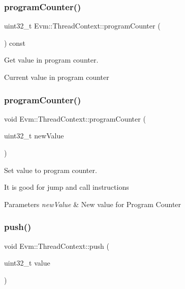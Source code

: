 \subsubsection{\texorpdfstring{program\+Counter()}{programCounter()}\hspace{0.1cm}{\footnotesize\ttfamily [1/2]}}
{\footnotesize\ttfamily uint32\+\_\+t Evm\+::\+Thread\+Context\+::program\+Counter (\begin{DoxyParamCaption}{ }\end{DoxyParamCaption}) const}



Get value in program counter. 

Current value in program counter \mbox{\label{struct_evm_1_1_thread_context_accc8a047d91d5dc8defd19d9a1a1e5a1}} 
\subsubsection{\texorpdfstring{program\+Counter()}{programCounter()}\hspace{0.1cm}{\footnotesize\ttfamily [2/2]}}
{\footnotesize\ttfamily void Evm\+::\+Thread\+Context\+::program\+Counter (\begin{DoxyParamCaption}\item[{uint32\+\_\+t}]{new\+Value }\end{DoxyParamCaption})}



Set value to program counter. 

It is good for jump and call instructions 
\begin{DoxyParams}{Parameters}
{\em new\+Value} & New value for Program Counter \\
\hline
\end{DoxyParams}
\mbox{\label{struct_evm_1_1_thread_context_aaf430328926f33c679492b43e79ca302}} 
\subsubsection{\texorpdfstring{push()}{push()}}
{\footnotesize\ttfamily void Evm\+::\+Thread\+Context\+::push (\begin{DoxyParamCaption}\item[{uint32\+\_\+t}]{value }\end{DoxyParamCaption})}



